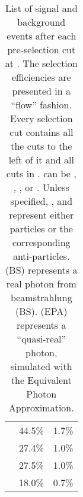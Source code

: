 \begin{table}[!tbp]
\begin{tabular}{lrr}
\gammagamma{\Pphoton}{\BS}{\Pphoton}{\BS}{ \Pquark \Pquark \Pquark \Pquark}& 44.5\%& 1.7\%\\
\gammagamma{\Pphoton}{\BS}{\Pphoton}{\EPA}{ \Pquark \Pquark \Pquark \Pquark}& 27.4\%& 1.0\%\\
\gammagamma{\Pphoton}{\EPA}{\Pphoton}{\BS}{ \Pquark \Pquark \Pquark \Pquark}& 27.5\%& 1.0\%\\
\gammagamma{\Pphoton}{\EPA}{\Pphoton}{\EPA}{ \Pquark \Pquark \Pquark \Pquark} & 18.0\% & 0.7\%\\
\hline \hline
\end{tabular}
\caption
{List of signal and background events after each pre-selection cut at .  The selection efficiencies are presented in a ``flow'' fashion. Every selection cut contains all the cuts to the left of it and all  cuts in . \Pquark can be \Pup, \Pdown, \Pstrange, \Pbottom or \Ptop. Unless specified, \Pquark, \Plepton and \Pnu represent either particles or the corresponding anti-particles. \Pphoton(BS) represents a real photon from beamstrahlung (BS). \Pphoton(EPA) represents a ``quasi-real'' photon, simulated with the Equivalent Photon Approximation.}
\label{tab:doubleHiggs3TeVPreslectionPart2}
\end{table}


%
